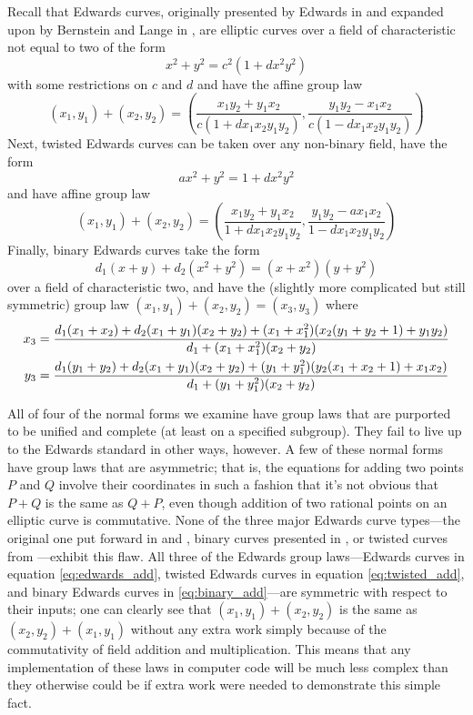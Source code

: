 Recall that Edwards curves, originally presented by Edwards in
    \cite{edwards2007normal} and expanded upon by Bernstein and Lange in
    \cite{bernstein2007faster}, are elliptic curves over a field of
    characteristic not equal to two of the form
\[
x^2 + y^2 = c^2(1 + dx^2y^2)
\]
    with some restrictions on $c$ and $d$ and have the affine group law
\begin{equation}\label{eq:edwards_add}
(x_1, y_1) + (x_2, y_2) =
\left(
\frac{x_1y_2 + y_1x_2}{c(1 + dx_1x_2y_1y_2)},
\frac{y_1y_2 - x_1x_2}{c(1 - dx_1x_2y_1y_2)}
\right)
\end{equation}
Next, twisted Edwards curves can be taken over any non-binary field, have the
    form
\[
ax^2 + y^2 = 1 + dx^2y^2
\]
    and have affine group law
\begin{equation}\label{eq:twisted_add}
(x_1, y_1) + (x_2, y_2) =
\left(
\frac{x_1y_2 + y_1x_2}{1 + dx_1x_2y_1y_2},
\frac{y_1y_2 - ax_1x_2}{1 - dx_1x_2y_1y_2}
\right)
\end{equation}
Finally, binary Edwards curves take the form
\[
d_1(x + y) + d_2(x^2 + y^2) = (x + x^2)(y + y^2)
\]
    over a field of characteristic two, and have the (slightly more complicated
    but still symmetric) group law $(x_1, y_1) + (x_2, y_2) = (x_3, y_3)$ where
\begin{align}\label{eq:binary_add}
x_3 &=  \frac{d_1(x_1 + x_2) + d_2(x_1 + y_1)(x_2 + y_2) + (x_1 + x_1^2)
            (x_2(y_1 + y_2 + 1) + y_1y_2)}{d_1 + (x_1 + x_1^2)(x_2 + y_2)}\\
\notag
y_3 &=  \frac{d_1(y_1 + y_2) + d_2(x_1 + y_1)(x_2 + y_2) + (y_1 + y_1^2)
            (y_2(x_1 + x_2 + 1) + x_1x_2)}{d_1 + (y_1 + y_1^2)(x_2 + y_2)}
\end{align}

All of four of the normal forms we examine have group laws that are
    purported to be unified and complete (at least on a specified subgroup).
They fail to live up to the Edwards standard in other ways, however.
A few of these normal forms have group laws that are asymmetric; that is, the
    equations for adding two points $P$ and $Q$ involve their coordinates in
    such a fashion that it's not obvious that $P + Q$ is the same as $Q + P$,
    even though addition of two rational points on an elliptic curve is
    commutative.
None of the three major Edwards curve types---the original one put forward in
    \cite{edwards2007normal} and \cite{bernstein2007faster}, binary curves
    presented in \cite{bernstein2008binary}, or twisted curves from
    \cite{bernstein2008twisted}---exhibit this flaw.
All three of the Edwards group laws---Edwards curves in equation
    \ref{eq:edwards_add}, twisted Edwards curves in equation
    \ref{eq:twisted_add}, and binary Edwards curves in
    \ref{eq:binary_add}---are symmetric with respect to their inputs; one can
    clearly see that $(x_1, y_1) + (x_2, y_2)$ is the same as $(x_2, y_2) +
    (x_1, y_1)$ without any extra work simply because of the commutativity of
    field addition and multiplication.
This means that any implementation of these laws in computer code will be much
    less complex than they otherwise could be if extra work were needed to
    demonstrate this simple fact.

